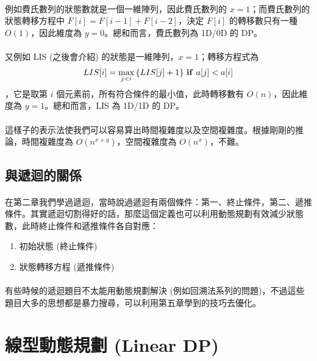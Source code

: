 \documentclass[12pt,a4paper,oneside]{report}
\begin{document}
\begin{CJK}{UTF8}{bkai}
\paragraph{}例如費氏數列的狀態數就是一個一維陣列，因此費氏數列的 $x=1$；而費氏數列的狀態轉移方程中 $F[i]=F[i-1]+F[i-2]$，決定 $F[i]$ 的轉移數只有一種 $O(1)$，因此維度為 $y=0$。總和而言，費氏數列為 1D/0D 的 DP。
\paragraph{}又例如 LIS (之後會介紹) 的狀態是一維陣列，$x=1$；轉移方程式為
\begin{align*}
LIS[i] = \max_{j<i}{\{LIS[j]+1\}}\text{ \textbf{if} }a[j]<a[i]
\end{align*}
，它是取第 $i$ 個元素前，所有符合條件的最小值，此時轉移數有 $O(n)$，因此維度為 $y=1$。總和而言，LIS 為 1D/1D 的 DP。
\paragraph{}這樣子的表示法使我們可以容易算出時間複雜度以及空間複雜度。根據剛剛的推論，時間複雜度為 $O(n^{x+y})$，空間複雜度為 $O(n^{x})$，不難。

\subsection{與遞迴的關係}

\paragraph{}在第二章我們學過遞迴，當時說過遞迴有兩個條件：第一、終止條件，第二、遞推條件。其實遞迴切割得好的話，那麼這個定義也可以利用動態規劃有效減少狀態數，此時終止條件和遞推條件各自對應：

\begin{enumerate}
\item 初始狀態 (終止條件)
\item 狀態轉移方程 (遞推條件)
\end{enumerate}

\paragraph{}有些時候的遞迴題目不太能用動態規劃解決 (例如回溯法系列的問題)，不過這些題目大多的思想都是暴力搜尋，可以利用第五章學到的技巧去優化。

\section{線型動態規劃 (Linear DP)}


\end{CJK}
\end{document}
